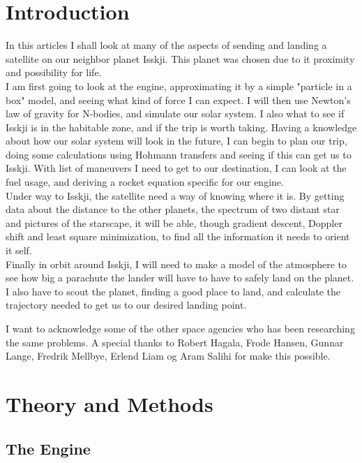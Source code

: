 \documentclass[a4paper, 10pt]{article}
\begin{document}
\tableofcontents

\section{Introduction}

In this articles I shall look at many of the aspects of sending and landing a satellite on our neighbor planet Isskji. This planet was chosen due to it proximity and possibility for life.\\

I am first going to look at the engine, approximating it by a simple "particle in a box" model, and seeing what kind of force I can expect. I will then use Newton's law of gravity for N-bodies, and simulate our solar system. I also what to see if Isskji is in the habitable zone, and if the trip is worth taking. Having a knowledge about how our solar system will look in the future, I can begin to plan our trip, doing some calculations using Hohmann transfers and seeing if this can get us to Isskji. With list of maneuvers I need to get to our destination, I can look at the fuel usage, and deriving a rocket equation specific for our engine. \\

Under way to Isskji, the satellite need a way of knowing where it is. By getting data about the distance to the other planets, the spectrum of two distant star and pictures of the starscape, it will be able, though gradient descent, Doppler shift and least square minimization, to find all the information it needs to orient it self.\\

Finally in orbit around Isskji, I will need to make a model of the atmosphere to see how big a parachute the lander will have to have to safely land on the planet. I also have to scout the planet, finding a good place to land, and calculate the trajectory needed to get us to our desired landing point.

I want to acknowledge some of the other space agencies who has been researching the same problems. A special thanks to Robert Hagala, Frode Hansen, Gunnar Lange, Fredrik Mellbye, Erlend Liam og Aram Salihi for make this possible.

\section{Theory and Methods}

\subsection{The Engine}
\end{document}

